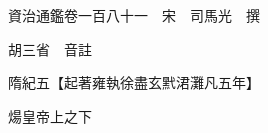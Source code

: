 










 


 
 


 

  
  
  
  
  





  
  
  
  
  
 
  

  

  
  
  



  

 
 

  
   




  

  
  


  　　資治通鑑卷一百八十一　宋　司馬光　撰

　　胡三省　音註

　　隋紀五【起著雍執徐盡玄黓涒灘凡五年】

　　煬皇帝上之下


